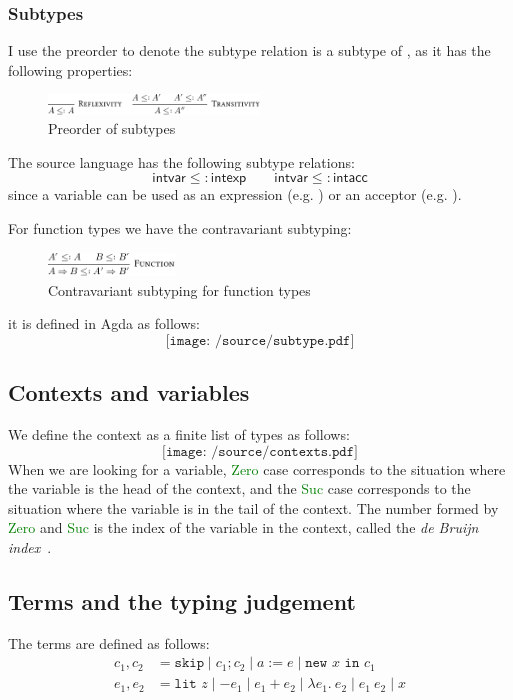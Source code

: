 \documentclass[12pt,a4paper]{report}
\theoremstyle{definition}
\newcommand{\gn}[1]{\textcolor{green}{#1}}
\newcommand{\gnt}[1]{\gn{\textsf{#1}}}
\begin{document}
        \subsubsection{Subtypes}
        I use the preorder  to denote the subtype relation  is a subtype of , as it has the following properties:
        \begin{figure}[H]
            \centering
            \includegraphics[width=0.5\textwidth]{subtype.pdf}
            \caption{Preorder of subtypes}
            \label{fig: subtype}
        \end{figure}

        The source language has the following subtype relations:
        \[ \textsf{intvar} \leq: \textsf{intexp} \qquad \textsf{intvar} \leq: \textsf{intacc} \]
        since a variable can be used as an expression (e.g. ) or an acceptor (e.g. ).

        For function types we have the contravariant subtyping:
        \begin{figure}[H]
            \centering
            \includegraphics[width=0.3\textwidth]{subtype_function.pdf}
            \caption{Contravariant subtyping for function types}
            \label{fig: subtype_fun}
        \end{figure}
        
        it is defined in Agda as follows:
        \[\texttt{[image: /source/subtype.pdf]}\]

        \subsection{Contexts and variables}
        We define the context as a finite list of types as follows:
        \[\texttt{[image: /source/contexts.pdf]}\]
        When we are looking for a variable, \gnt{Zero} case corresponds to the situation where the variable is the head of the context, and the \gnt{Suc} case corresponds to the situation where the variable is in the tail of the context. The number formed by \gnt{Zero} and \gnt{Suc} is the index of the variable in the context, called the \emph{de Bruijn index}~\autocite{de_bruijn}. 


        \subsection{Terms and the typing judgement} \label{subsec: terms}
        The terms are defined as follows:
        \[\begin{aligned}
            c_1, c_2 &= \texttt{skip} \mid c_1; c_2 \mid a := e \mid \texttt{new } x \texttt{ in } c_1 \\
            e_1, e_2 &= \texttt{lit } z \mid -e_1 \mid e_1 + e_2 \mid \lambda e_1.\ e_2 \mid e_1\ e_2 \mid x \\
        \end{aligned}\]
        
\end{document}
